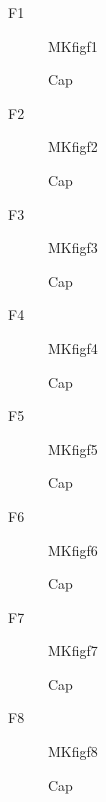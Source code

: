\documentclass{beamer}
\begin{document}
\begin{frame}{F1}\begin{figure}\centering MKfigf1\caption{Cap}\label{fig:f1}\end{figure}\end{frame}
\begin{frame}{F2}\begin{figure}\centering MKfigf2\caption{Cap}\label{fig:f2}\end{figure}\end{frame}
\begin{frame}{F3}\begin{figure}\centering MKfigf3\caption{Cap}\label{fig:f3}\end{figure}\end{frame}
\begin{frame}{F4}\begin{figure}\centering MKfigf4\caption{Cap}\label{fig:f4}\end{figure}\end{frame}
\begin{frame}{F5}\begin{figure}\centering MKfigf5\caption{Cap}\label{fig:f5}\end{figure}\end{frame}
\begin{frame}{F6}\begin{figure}\centering MKfigf6\caption{Cap}\label{fig:f6}\end{figure}\end{frame}
\begin{frame}{F7}\begin{figure}\centering MKfigf7\caption{Cap}\label{fig:f7}\end{figure}\end{frame}
\begin{frame}{F8}\begin{figure}\centering MKfigf8\caption{Cap}\label{fig:f8}\end{figure}\end{frame}
\end{document}
